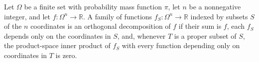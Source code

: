 \begin{definition}
\label{FABL.IsOrthogonalDecomposition}
\leanok
{}
Let $\Omega$ be a finite set with probability mass function $\pi$, let $n$ be a
nonnegative integer, and let $f\colon\Omega^n\to\mathbb{R}$. A family of functions
$f_S\colon\Omega^n\to\mathbb{R}$ indexed by subsets $S$ of the $n$ coordinates is an
orthogonal decomposition of $f$ if their sum is $f$, each $f_S$ depends only on the
coordinates in $S$, and, whenever $T$ is a proper subset of $S$, the product-space inner
product of $f_S$ with every function depending only on coordinates in $T$ is zero.
\end{definition}

